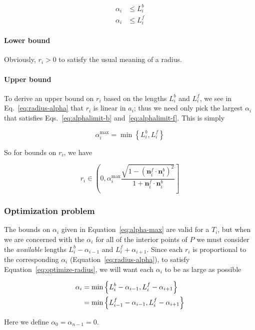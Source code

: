 \documentclass{article}
\begin{document}
\begin{align}
  \label{eq:alphalimit-b}
  \alpha_i &\le L^{b}_{i}\\
  \label{eq:alphalimit-f}
  \alpha_i &\le L^{f}_{i}
\end{align}

\paragraph{Lower bound}

Obviously, $r_i > 0$ to satisfy the usual meaning of a radius.

\paragraph{Upper bound}

To derive an upper bound on $r_{i}$ based on the lengths $L^b_i$ and $L^f_i$, we see in Eq.~\eqref{eq:radius-alpha} that $r_{i}$ is linear in $a_{i}$; thus we need only pick the largest $\alpha_i$ that satisfies Eqs.~\eqref{eq:alphalimit-b} and~\eqref{eq:alphalimit-f}.  This is simply

\begin{equation}
  \label{eq:alpha-max}
  \alpha^{\max}_i = \min \left\{L^{b}_{i}, L^{f}_{i}\right\}
\end{equation}

So for bounds on $r_{i}$, we have

\begin{equation}
  \label{eq:rbounds}
  r_{i} \in \left(0, \alpha^{\max}_i \frac{\sqrt{1-\left(\mathbf{n}^f_i\cdot \mathbf{n}^b_i\right)^{2}}}{1+\mathbf{n}^f_i\cdot \mathbf{n}^b_i}\right]
\end{equation}

\subsubsection{Optimization problem}
\label{sec:optimization}

The bounds on $\alpha_i$ given in Equation~\eqref{eq:alpha-max} are valid for a $T_{i}$, but when we are concerned with the $\alpha_i$ for all of the interior points of $P$ we must consider the \emph{available} lengths $L^{b}_{i}-\alpha_{i-1}$ and $L^{f}_{i}+\alpha_{i+1}$.  Since each $r_{i}$ is proportional to the corresponding $\alpha_i$ (Equation~\eqref{eq:radius-alpha}), to satisfy Equation~\eqref{eq:optimize-radius}, we will want each $\alpha_i$ to be as large as possible

\begin{align}
  \notag
  \alpha_i &= \min \left\{L^{b}_{i}-\alpha_{i-1}, L^{f}_{i}-\alpha_{i+1}\right\} \\
  \label{eq:alpha-optimize}
  &= \min \left\{L^{f}_{i-1}-\alpha_{i-1}, L^{f}_{i}-\alpha_{i+1}\right\}
\end{align}

Here we define $\alpha_0 = \alpha_{n-1} = 0$.
\end{document}
